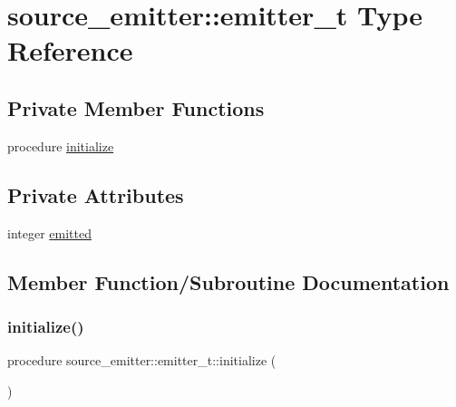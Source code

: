\hypertarget{structsource__emitter_1_1emitter__t}{}\section{source\+\_\+emitter\+:\+:emitter\+\_\+t Type Reference}
\label{structsource__emitter_1_1emitter__t}
\subsection*{Private Member Functions}
\begin{DoxyCompactItemize}
\item 
procedure \mbox{\hyperlink{structsource__emitter_1_1emitter__t_aed2db993a937e50d5252b41cefcf6e35}{initialize}}
\end{DoxyCompactItemize}
\subsection*{Private Attributes}
\begin{DoxyCompactItemize}
\item 
integer \mbox{\hyperlink{structsource__emitter_1_1emitter__t_a30062afe1a31dcfd77c90762d8c8cb5c}{emitted}}
\end{DoxyCompactItemize}


\subsection{Member Function/\+Subroutine Documentation}
\mbox{\label{structsource__emitter_1_1emitter__t_aed2db993a937e50d5252b41cefcf6e35}} 
\subsubsection{\texorpdfstring{initialize()}{initialize()}}
{\footnotesize\ttfamily procedure source\+\_\+emitter\+::emitter\+\_\+t\+::initialize (\begin{DoxyParamCaption}{ }\end{DoxyParamCaption})\hspace{0.3cm}{\ttfamily [private]}}



